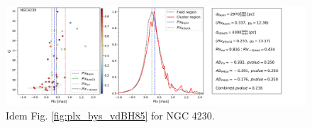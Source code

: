 \documentclass[draft]{aa}
\begin{document}
\begin{figure}[ht]
    \centering
    \includegraphics[width=\hsize]{../figs/plx_NGC4230.png}
    \caption{Idem Fig. \ref{fig:plx_bys_vdBH85} for NGC 4230.}
    \label{fig62}
\end{figure}
\end{document}
